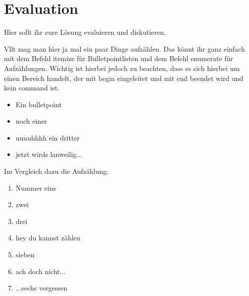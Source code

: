 \section{Evaluation}\label{sec:evaluation}
Hier sollt ihr eure Lösung evaluieren und diskutieren.

Vllt mag man hier ja mal ein paar Dinge aufzählen. Das könnt ihr ganz einfach mit dem Befehl itemize für Bulletpointlisten und dem Befehl enumerate für Aufzählungen. Wichtig ist hierbei jedoch zu beachten, dass es sich hierbei um einen Bereich handelt, der mit begin eingeleitet und mit end beendet wird und kein command ist.
\begin{itemize}
	\item Ein bulletpoint
	\item noch einer
	\item uuuuhhhh ein dritter
	\item jetzt wirds lanweilig...
\end{itemize}
Im Vergleich dazu die Aufzählung:
\begin{enumerate}
	\item Nummer eins
	\item zwei
	\item drei
	\item hey du kannst zählen
	\item sieben
	\item ach doch nicht...
	\item ...sechs vergessen
\end{enumerate}